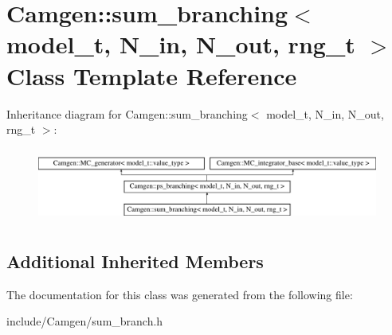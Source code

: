 \hypertarget{a00526}{}\section{Camgen\+:\+:sum\+\_\+branching$<$ model\+\_\+t, N\+\_\+in, N\+\_\+out, rng\+\_\+t $>$ Class Template Reference}
\label{a00526}
Inheritance diagram for Camgen\+:\+:sum\+\_\+branching$<$ model\+\_\+t, N\+\_\+in, N\+\_\+out, rng\+\_\+t $>$\+:\begin{figure}[H]
\begin{center}
\leavevmode
\includegraphics[height=2.470588cm]{a00526}
\end{center}
\end{figure}
\subsection*{Additional Inherited Members}


The documentation for this class was generated from the following file\+:\begin{DoxyCompactItemize}
\item 
include/\+Camgen/sum\+\_\+branch.\+h\end{DoxyCompactItemize}

